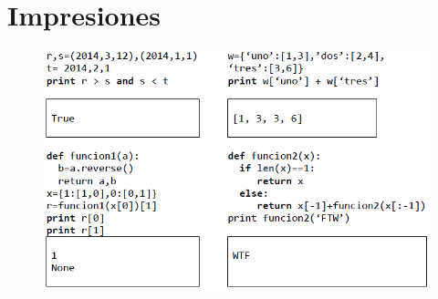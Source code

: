 \section{Impresiones}
\begin{figure}[h]
    \centering
    \includegraphics[scale=0.75]{Imagenes/printpauta.PNG}
\end{figure}